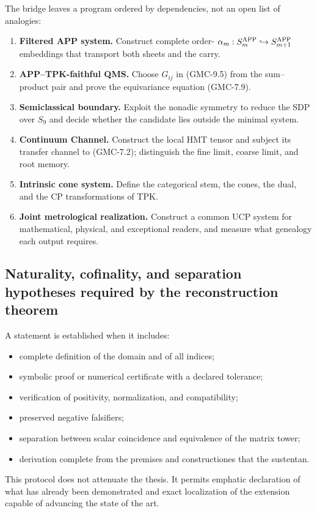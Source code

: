 The bridge leaves a program ordered by dependencies, not an open list of
analogies:

\begin{enumerate}
 \item \textbf{Filtered APP system.} Construct complete order-
 $\alpha_m:\mathcal S_m^{\rm APP}\hookrightarrow
 \mathcal S_{m+1}^{\rm APP}$ embeddings that transport both sheets and the carry.
 \item \textbf{APP--TPK-faithful QMS.} Choose $G_{ij}$ in
 \textup{(GMC-9.5)} from the sum--product pair and prove the
 equivariance equation \textup{(GMC-7.9)}.
 \item \textbf{Semiclassical boundary.} Exploit the nonadic symmetry to
 reduce the SDP over $S_9$ and decide whether the candidate lies outside the
 minimal system.
 \item \textbf{Continuum Channel.} Construct the local HMT tensor and subject
 its transfer channel to \textup{(GMC-7.2)}; distinguish the fine limit,
 coarse limit, and root
 memory.
 \item \textbf{Intrinsic cone system.} Define the categorical stem, the
 cones, the dual, and the CP transformations of TPK.
 \item \textbf{Joint metrological realization.} Construct a common UCP
 system for mathematical, physical, and exceptional readers, and measure what
 genealogy each output requires.
\end{enumerate}

\subsection{Naturality, cofinality, and separation hypotheses required by the reconstruction theorem}

A statement is established when it includes:

\begin{itemize}
 \item complete definition of the domain and of all indices;
 \item symbolic proof or numerical certificate with a declared tolerance;
 \item verification of positivity, normalization, and compatibility;
 \item preserved negative falsifiers;
 \item separation between scalar coincidence and equivalence of the matrix
 tower;
 \item derivation complete from the premises and constructiones that the sustentan.
\end{itemize}

This protocol does not attenuate the thesis. It permits emphatic declaration of what
has already been demonstrated and exact localization of the extension capable of advancing
the state of the art.
